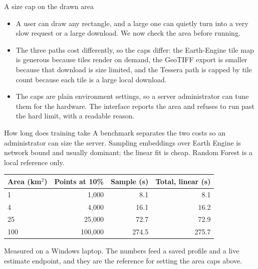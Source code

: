\documentclass[aspectratio=169]{beamer}
\begin{document}
\begin{frame}{A size cap on the drawn area}
\begin{itemize}
  \item A user can draw any rectangle, and a large one can quietly turn into a very slow request or
  a large download. We now check the area before running.
  \item The three paths cost differently, so the caps differ: the Earth-Engine tile map is generous
  because tiles render on demand, the GeoTIFF export is smaller because that download is size
  limited, and the Tessera path is capped by tile count because each tile is a large local
  download.
  \item The caps are plain environment settings, so a server administrator can tune them for the
  hardware. The interface reports the area and refuses to run past the hard limit, with a readable
  reason.
\end{itemize}
\end{frame}

\begin{frame}{How long does training take}
A benchmark separates the two costs so an administrator can size the server. Sampling embeddings
over Earth Engine is network bound and usually dominant; the linear fit is cheap. Random Forest is a
local reference only.
\vspace{3mm}
\centering
\begin{tabular}{lrrr}
\toprule
Area (km$^2$) & Points at 10\% & Sample (s) & Total, linear (s) \\
\midrule
1 & 1{,}000 & 8.1 & 8.1 \\
4 & 4{,}000 & 16.1 & 16.2 \\
25 & 25{,}000 & 72.7 & 72.9 \\
100 & 100{,}000 & 274.5 & 275.7 \\
\bottomrule
\end{tabular}
\vspace{3mm}
\begin{flushleft}\small
Measured on a Windows laptop. The numbers feed a saved profile and a live estimate endpoint, and
they are the reference for setting the area caps above.
\end{flushleft}
\end{frame}
\end{document}
